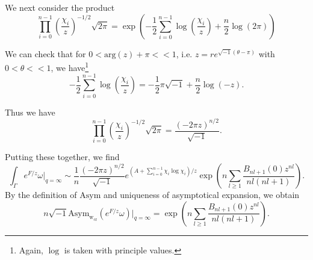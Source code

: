 \documentclass[12pt]{amsart}
\numberwithin{equation}{section}
\begin{document}
We next consider the product
\begin{equation*}
\prod_{i=0}^{n-1}\left(\frac{\chi_i}{z} \right)^{-1/2}\sqrt{2\pi}=\exp\left(-\frac{1}{2}\sum_{i=0}^{n-1}\log\left(\frac{\chi_i}{z} \right)+\frac{n}{2}\log(2\pi) \right)    
\end{equation*}

We can check that for $0<\text{arg}(z)+\pi<<1$, i.e. $z=re^{\sqrt{-1}(\theta-\pi)}$ with $0<\theta<<1$, we have\footnote{Again, $\log$ is taken with principle values.}
\begin{equation*}
-\frac{1}{2}\sum_{i=0}^{n-1}\log\left(\frac{\chi_i}{z} \right)=-\frac{1}{2}\pi\sqrt{-1}+\frac{n}{2}\log(-z).    
\end{equation*}

Thus we have
\begin{equation*}
\prod_{i=0}^{n-1}\left(\frac{\chi_i}{z} \right)^{-1/2}\sqrt{2\pi}=\frac{(-2\pi z)^{n/2}}{\sqrt{-1}}.    
\end{equation*}

Putting these together, we find
\begin{equation*}
\int_\Gamma e^{F/z}\omega|_{q=\infty}\sim \frac{1}{n}\frac{(-2\pi z)^{n/2}}{\sqrt{-1}}e^{(A+\sum_{i=0}^{n-1}\chi_i\log\chi_i)/z}\exp\left(n\sum_{l\geq 1}\frac{B_{nl+1}(0)z^{nl}}{nl(nl+1)}\right). 
\end{equation*}
By the definition of $\text{Asym}$ and uniqueness of asymptotical expansion, we obtain
\begin{equation}\label{eqn:formal_asym_infty_1}
n\sqrt{-1}\text{Asym}_{\mathrm{w}_{\text{cr}}}(e^{F/z}\omega)|_{q=\infty}=\exp\left(n\sum_{l\geq 1}\frac{B_{nl+1}(0)z^{nl}}{nl(nl+1)}\right).    
\end{equation}
\end{document}
